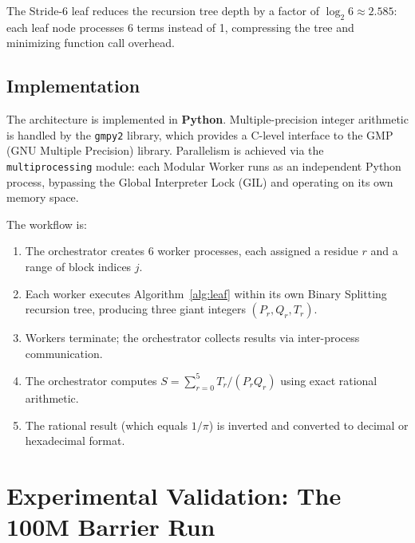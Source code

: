 \documentclass[12pt,a4paper]{article}
\theoremstyle{plain}
\theoremstyle{definition}
\theoremstyle{remark}
\begin{document}
The Stride-6 leaf reduces the recursion tree depth by a factor of \(\log_2 6 \approx 2.585\): each leaf node processes 6 terms instead of 1, compressing the tree and minimizing function call overhead.

\subsection{Implementation}
The architecture is implemented in \textbf{Python}. Multiple-precision integer arithmetic is handled by the \texttt{gmpy2} library, which provides a C-level interface to the GMP (GNU Multiple Precision) library. Parallelism is achieved via the \texttt{multiprocessing} module: each Modular Worker runs as an independent Python process, bypassing the Global Interpreter Lock (GIL) and operating on its own memory space.

The workflow is:
\begin{enumerate}
    \item The orchestrator creates 6 worker processes, each assigned a residue \(r\) and a range of block indices \(j\).
    \item Each worker executes Algorithm~\ref{alg:leaf} within its own Binary Splitting recursion tree, producing three giant integers \((P_r, Q_r, T_r)\).
    \item Workers terminate; the orchestrator collects results via inter-process communication.
    \item The orchestrator computes \(S = \sum_{r=0}^{5} T_r / (P_r Q_r)\) using exact rational arithmetic.
    \item The rational result (which equals \(1/\pi\)) is inverted and converted to decimal or hexadecimal format.
\end{enumerate}

\section{Experimental Validation: The 100M Barrier Run}
\label{sec:benchmark}
\end{document}
